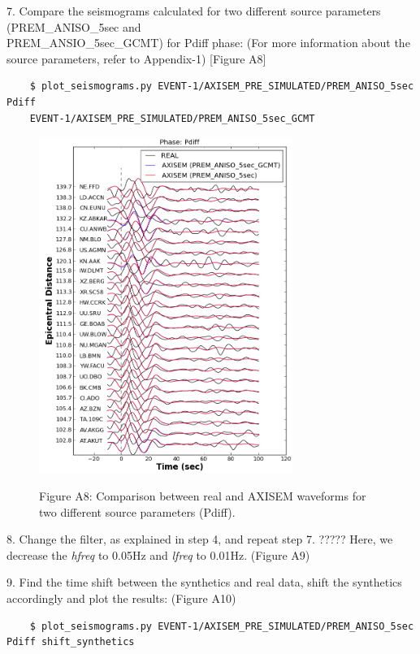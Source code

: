 \documentclass{article}
\begin{document}
7. Compare the seismograms calculated for two different source parameters (PREM\_ANISO\_5sec and \\
PREM\_ANSIO\_5sec\_GCMT) for Pdiff phase: (For more information about the source 
parameters, refer to Appendix-1) [Figure A8]

\begin{verbatim}
    $ plot_seismograms.py EVENT-1/AXISEM_PRE_SIMULATED/PREM_ANISO_5sec Pdiff 
    EVENT-1/AXISEM_PRE_SIMULATED/PREM_ANISO_5sec_GCMT
\end{verbatim}

\begin{figure}
\centering
\includegraphics[width=234pt, height=310pt, keepaspectratio=true]{AXISEMTutorial-fig014.png}
\begin{center}
{\small{}Figure A8: Comparison between real and AXISEM waveforms for two different 
source parameters (Pdiff).}
\end{center}
\end{figure}

8. Change the filter, as explained in step 4, and repeat step 7. ????? Here, we decrease 
the \textit{hfreq} to 0.05Hz and \textit{lfreq} to 0.01Hz. (Figure A9)

9. Find the time shift between the synthetics and real data, shift the synthetics 
accordingly and plot the results: (Figure A10)

\begin{verbatim}
    $ plot_seismograms.py EVENT-1/AXISEM_PRE_SIMULATED/PREM_ANISO_5sec Pdiff shift_synthetics
\end{verbatim}
\end{document}
